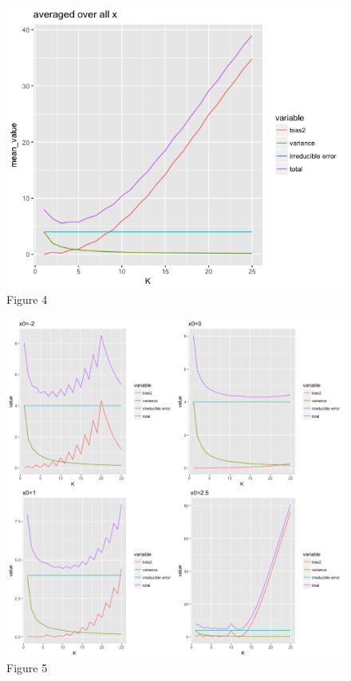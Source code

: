 \documentclass[]{article}
\begin{document}
\begin{figure}
\centering
\includegraphics{Prob1f4.png}
\caption{Figure 4}
\end{figure}

\begin{figure}
\centering
\includegraphics{Prob1f5.png}
\caption{Figure 5}
\end{figure}
\end{document}
